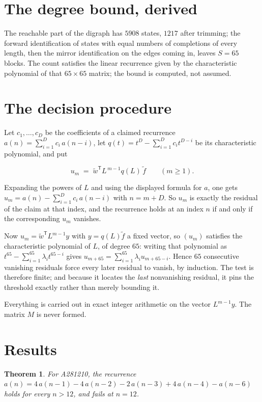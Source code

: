 \documentclass[11pt]{article}
\newtheorem{theorem}{Theorem}
\theoremstyle{definition}
\begin{document}
\section{The degree bound, derived}

The reachable part of the digraph has $5908$ states, $1217$ after trimming; the forward identification of states with equal numbers of completions of every length, then the mirror identification on the edges coming in, leaves $S = 65$ blocks. The count satisfies the linear recurrence given by the characteristic polynomial of that $65\times65$ matrix; the bound is computed, not assumed.

\section{The decision procedure}

Let $c_1,\dots,c_D$ be the coefficients of a claimed recurrence $a(n) = \sum_{i=1}^{D} c_i\,a(n-i)$, let $q(t) = t^{D} - \sum_{i=1}^{D} c_i t^{D-i}$ be its characteristic polynomial, and put

\[u_m \;=\; \tilde w^{\mathsf T} L^{\,m-1} q(L)\,\tilde f \qquad (m \ge 1).\]

Expanding the powers of $L$ and using the displayed formula for $a$, one gets $u_m = a(n) - \sum_{i=1}^{D} c_i\,a(n-i)$ with $n = m + D$. So $u_m$ is exactly the residual of the claim at that index, and the recurrence holds at an index $n$ if and only if the corresponding $u_m$ vanishes.

Now $u_m = \tilde w^{\mathsf T} L^{m-1} y$ with $y = q(L)\tilde f$ a fixed vector, so $(u_m)$ satisfies the characteristic polynomial of $L$, of degree $65$: writing that polynomial as $t^{65} - \sum_{i=1}^{65} \lambda_i t^{65-i}$ gives $u_{m+65} = \sum_{i=1}^{65} \lambda_i u_{m+65-i}$. Hence $65$ consecutive vanishing residuals force every later residual to vanish, by induction. The test is therefore finite; and because it locates the {\itshape last} nonvanishing residual, it pins the threshold exactly rather than merely bounding it.

Everything is carried out in exact integer arithmetic on the vector $L^{m-1}y$. The matrix $M$ is never formed.

\section{Results}

\begin{theorem} For A281210, the recurrence $a(n) = 4\,a(n-1) - 4\,a(n-2) - 2\,a(n-3) + 4\,a(n-4) - a(n-6)$ holds for every $n > 12$, and fails at $n = 12$.\end{theorem}
\end{document}
